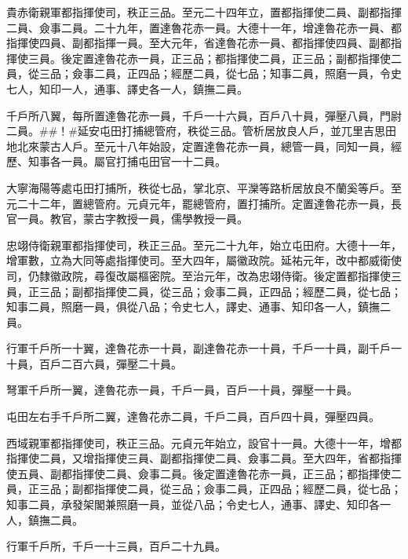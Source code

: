 \begin{pinyinscope}
 貴赤衛親軍都指揮使司，秩正三品。至元二十四年立，置都指揮使二員、副都指揮二員、僉事二員。二十九年，置達魯花赤一員。大德十一年，增達魯花赤一員、都指揮使四員、副都指揮一員。至大元年，省達魯花赤一員、都指揮使四員、副都指揮使三員。後定置達魯花赤一員，正三品；都指揮使二員，正三品；副都指揮使二員，從三品；僉事二員，正四品；經歷二員，從七品；知事二員，照磨一員，令史七人，知印一人，通事、譯史各一人，鎮撫二員。



 千戶所八翼，每所置達魯花赤一員，千戶一十六員，百戶八十員，彈壓八員，門尉二員。##！#延安屯田打捕總管府，秩從三品。管析居放良人戶，並兀里吉思田地北來蒙古人戶。至元十八年始設，定置達魯花赤一員，總管一員，同知一員，經歷、知事各一員。屬官打捕屯田官一十二員。



 大寧海陽等處屯田打捕所，秩從七品，掌北京、平灤等路析居放良不蘭奚等戶。至元二十二年，置總管府。元貞元年，罷總管府，置打捕所。定置達魯花赤一員，長官一員。教官，蒙古字教授一員，儒學教授一員。



 忠翊侍衛親軍都指揮使司，秩正三品。至元二十九年，始立屯田府。大德十一年，增軍數，立為大同等處指揮使司。至大四年，屬徽政院。延祐元年，改中都威衛使司，仍隸徽政院，尋復改屬樞密院。至治元年，改為忠翊侍衛。後定置都指揮使三員，正三品；副都指揮使二員，從三品；僉事二員，正四品；經歷二員，從七品；知事二員，照磨一員，俱從八品；令史七人，譯史、通事、知印各一人，鎮撫二員。



 行軍千戶所一十翼，達魯花赤一十員，副達魯花赤一十員，千戶一十員，副千戶一十員，百戶二百六員，彈壓二十員。



 弩軍千戶所一翼，達魯花赤一員，千戶一員，百戶一十員，彈壓一十員。



 屯田左右手千戶所二翼，達魯花赤二員，千戶二員，百戶四十員，彈壓四員。



 西域親軍都指揮使司，秩正三品。元貞元年始立，設官十一員。大德十一年，增都指揮使二員，又增指揮使三員、副都指揮使二員、僉事二員。至大四年，省都指揮使五員、副都指揮使二員、僉事二員。後定置達魯花赤一員，正三品；都指揮使二員，正三品；副都指揮使二員，從三品；僉事二員，正四品；經歷二員，從七品；知事二員，承發架閣兼照磨一員，並從八品；令史七人，通事、譯史、知印各一人，鎮撫二員。



 行軍千戶所，千戶一十三員，百戶二十九員。




\end{pinyinscope}
